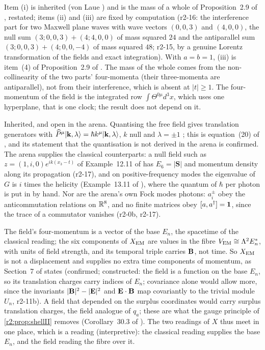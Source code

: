 Item (i) is inherited (von Laue \cite{Laue1911}) and is the mass of a whole of Proposition~2.9 of \cite{RE}, restated; items (ii) and (iii) are fixed by
computation (r2-16: the interference part for two Maxwell plane waves with wave vectors $(0,0,3)$ and $(4,0,0)$, the null sum $(3;0,0,3)+(4;4,0,0)$ of
mass squared $24$ and the antiparallel sum $(3;0,0,3)+(4;0,0,-4)$ of mass squared $48$; r2-15, by a genuine Lorentz transformation of the fields and exact integration). With $a=b=1$, (iii) is item~(4) of Proposition~2.9 of
\cite{RE}. The mass of the whole comes from the non-collinearity of the two parts' four-momenta (their three-momenta are antiparallel), not from their
interference, which is absent at $|t|\ge1$. The four-momentum
of the field is the integrated row $\int\Theta^{0\mu}d^3x$, which uses one hyperplane, that is one clock; the result does not depend on it.

\begin{remark}
\label{r2:rem:photon}
Inherited, and open in the arena. Quantising the free field gives translation generators with $\widehat P^\mu|\mathbf k,\lambda\rangle=\hbar k^\mu|\mathbf k,\lambda\rangle$,
$k$ null and $\lambda=\pm1$ \cite{Wigner39,WeinbergQFT}; this is equation~(20) of \cite{FMB}, and its statement that the quantisation is not derived in the arena
is confirmed. The arena supplies the classical counterparts: a null field such as $z=(1,i,0)e^{ik(x_3-t)}$ of Example~12.11 of \cite{ES17} has $E_6=|\mathbf S|$
and momentum density along its propagation (r2-17), and on positive-frequency modes the eigenvalue of $G$ is $i$ times the helicity (Example~13.11 of
\cite{ES17}), where the quantum of $\hbar$ per photon is put in by hand. Nor are the arena's own Fock modes photons: $a^\pm_i$ obey the anticommutation
relations on $\mathbb{R}^8$, and no finite matrices obey $[a,a^\dagger]=\mathbf 1$, since the trace of a commutator vanishes (r2-0b, r2-17).
\end{remark}

\begin{remark}
\label{r2:rem:base}
The field's four-momentum is a vector of the base $E_n$, the spacetime of the classical reading; the six components of $X_{\rm EM}$ are values in the fibre
$V_{\rm EM}\cong\Lambda^2E_n^*$, with units of field strength, and its temporal triple carries $\mathbf B$, not time. So $X_{\rm EM}$ is not a displacement and supplies
no extra time components of momentum, as Section~7 of \cite{FMB} states (confirmed; constructed: the field is a function on the base $E_n$, so its translation
charges carry indices of $E_n$; covariance alone would allow more, since the invariants $|\mathbf B|^2-|\mathbf E|^2$ and $\mathbf E\cdot\mathbf B$ map covariantly to the
trivial module $U_n$, r2-11b). A field that depended on the surplus coordinates would carry surplus
translation charges, the field analogue of $q_a$; these are what the gauge principle of \cref{r2:prop:shellII} removes (Corollary~30.3 of \cite{ES17}). The two
readings of $X$ thus meet in one place, which is a reading (interpretive): the classical reading supplies the base $E_n$, and the field
reading the fibre over it.
\end{remark}

